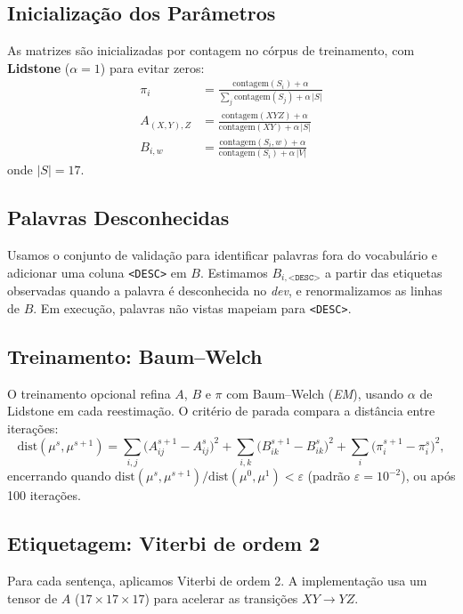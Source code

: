 \documentclass[12pt,a4paper]{article}
\begin{document}
\subsection{Inicialização dos Parâmetros}

As matrizes são inicializadas por contagem no córpus de treinamento, com \textbf{Lidstone} (\(\alpha = 1\)) para evitar zeros:
\begin{align*}
\pi_i &= \frac{\text{contagem}(S_i) + \alpha}{\sum_j \text{contagem}(S_j) + \alpha\,|S|} \\
A_{(X,Y),Z} &= \frac{\text{contagem}(XYZ) + \alpha}{\text{contagem}(XY) + \alpha\,|S|} \\
B_{i,w} &= \frac{\text{contagem}(S_i, w) + \alpha}{\text{contagem}(S_i) + \alpha\,|V|}
\end{align*}
onde \(|S|=17\).

\subsection{Palavras Desconhecidas}

Usamos o conjunto de validação para identificar palavras fora do vocabulário e adicionar uma coluna \texttt{<DESC>} em \(B\). Estimamos \(B_{i,\texttt{<DESC>}}\) a partir das etiquetas observadas quando a palavra é desconhecida no \textit{dev}, e renormalizamos as linhas de \(B\). Em execução, palavras não vistas mapeiam para \texttt{<DESC>}.

\subsection{Treinamento: Baum–Welch}

O treinamento opcional refina \(A\), \(B\) e \(\pi\) com Baum–Welch (\textit{EM}), usando \(\alpha\) de Lidstone em cada reestimação. O critério de parada compara a distância entre iterações:
\[
\mathrm{dist}(\mu^s, \mu^{s+1}) = \sum_{i,j}\big(A_{ij}^{s+1}-A_{ij}^s\big)^2 + \sum_{i,k}\big(B_{ik}^{s+1}-B_{ik}^s\big)^2 + \sum_i\big(\pi_i^{s+1}-\pi_i^s\big)^2,
\]
encerrando quando \(\mathrm{dist}(\mu^s,\mu^{s+1})/\mathrm{dist}(\mu^0,\mu^1) < \varepsilon\) (padrão \(\varepsilon=10^{-2}\)), ou após 100 iterações.

\subsection{Etiquetagem: Viterbi de ordem 2}

Para cada sentença, aplicamos Viterbi de ordem 2. A implementação usa um tensor de \(A\) (\(17\times 17\times 17\)) para acelerar as transições \(XY\to YZ\).
\end{document}
